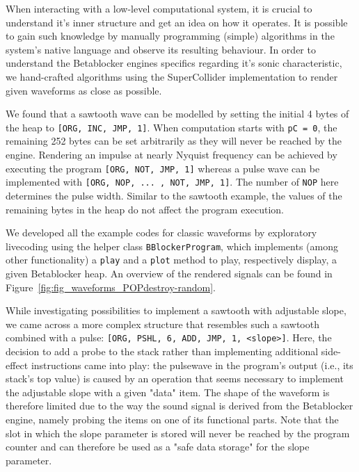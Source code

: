 \documentclass[letterpaper, 12pt]{article}
\begin{document}
When interacting with a low-level computational system, it is crucial to  understand it's inner structure and get an idea on how it operates.
It is possible to gain such knowledge by manually programming (simple) algorithms in the system's native language and observe its resulting behaviour.
In order to understand the Betablocker engines specifics regarding it's sonic characteristic, we hand-crafted algorithms using the SuperCollider implementation to render given waveforms as close as possible.

We found that a sawtooth wave can be modelled by setting the initial 4 bytes of the heap to
\texttt{[ORG, INC, JMP, 1]}.
When computation starts with \texttt{pC = 0}, the remaining 252 bytes can be set arbitrarily as they will never be reached by the engine.
Rendering an impulse at nearly Nyquist frequency can be achieved by executing the program \texttt{[ORG, NOT, JMP, 1]} whereas a pulse wave can be implemented with \texttt{[ORG, NOP, ... , NOT, JMP, 1]}.
The number of \texttt{NOP} here determines the pulse width.
Similar to the sawtooth example, the values of the remaining bytes in the heap do not affect the program execution.

We developed all the example codes for classic waveforms by exploratory livecoding using the helper class \texttt{BBlockerProgram}, which implements (among other functionality) a \texttt{play} and a \texttt{plot} method to play, respectively display, a given Betablocker heap.
An overview of the rendered signals can be found in Figure~\ref{fig:fig_waveforms_POPdestroy-random}.


While investigating possibilities to implement a sawtooth with adjustable slope, we came across a more complex structure that resembles such a sawtooth combined with a pulse: \texttt{[ORG, PSHL, 6, ADD, JMP, 1, <slope>]}. 
Here, the decision to add a probe to the stack rather than implementing additional side-effect instructions came into play: the pulsewave in the program's output (i.e., its stack's top value) is caused by an operation that seems necessary to implement the adjustable slope with a given "data" item.
The shape of the waveform is therefore limited due to the way the sound signal is derived from the Betablocker engine, namely probing the items on one of its functional parts.
Note that the slot in which the slope parameter is stored will never be reached by the program counter and can therefore be used as a "safe data storage" for the slope parameter.
\end{document}
